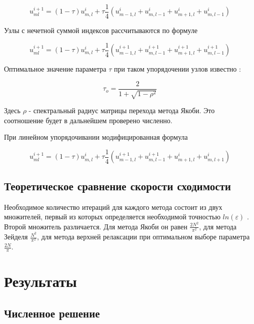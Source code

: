 \documentclass[report , a4paper, onecolumn, 12pt]{article}
\begin{document}
\begin{equation}
 u^{i + 1}_{ml} = (1-\tau) u^{i}_{m,l} + \tau \frac{1}{4} (u^{i}_{m-1, l} + u^{i}_{m, l-1} + u^{i}_{m + 1, l} + u^i_{m, l - 1}) 
\end{equation}

Узлы с нечетной суммой индексов рассчитываются по формуле

\begin{equation}
 u^{i + 1}_{ml} = (1-\tau) u^{i}_{m,l} + \tau \frac{1}{4} (u^{i + 1}_{m-1, l} + u^{i + 1}_{m, l-1} + u^{i + 1}_{m + 1, l} + u^{i + 1}_{m, l - 1}) 
\end{equation}

Оптимальное значение параметра $\tau$ при таком упорядочении узлов известно \cite{aristova}:

\begin{equation}
\label{tauo}\tau_o = \frac{2}{1 + \sqrt{1 - \rho^2}}
\end{equation}

Здесь $\rho$ - спектральный радиус матрицы перехода метода Якоби. Это соотношение будет в дальнейшем проверено численно.

При линейном упорядочивании модифицированная формула

\begin{equation}
 u^{i+1}_{ml} =  (1-\tau) u^{i}_{m,l}  + \tau \frac{1}{4} (u^{i+1}_{m-1, l} + u^{i+1}_{m, l-1} + u^{i}_{m + 1, l} + u^{i}_{m, l + 1}) 
\end{equation}

\subsection{Теоретическое сравнение скорости сходимости}

Необходимое количество итераций для каждого метода состоит из двух множителей, первый из которых определяется необходимой точностью $ln(\varepsilon)$ \cite{aristova}. Второй множитель различается. Для метода Якоби он равен $\frac{2N^2}{\pi^2}$, для метода Зейделя $\frac{N^2}{\pi^2}$, для метода верхней релаксации при оптимальном выборе параметра $\frac{2N}{\pi}$.

\section{Результаты}

\subsection{Численное решение}
\end{document}

